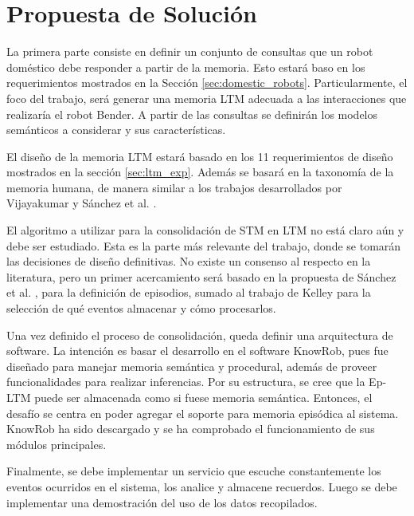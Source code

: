 \section{Propuesta de Solución}

%

La primera parte consiste en definir un conjunto de consultas que un robot doméstico debe responder a partir de la memoria. Esto estará baso en los requerimientos mostrados en la Sección \ref{sec:domestic_robots}. Particularmente, el foco del trabajo, será generar una memoria LTM adecuada a las interacciones que realizaría el robot Bender. A partir de las consultas se definirán los modelos semánticos a considerar y sus características. 

El diseño de la memoria LTM estará basado en los 11 requerimientos de diseño mostrados en la sección \ref{sec:ltm_exp}. Además se basará en la taxonomía de la memoria humana, de manera similar a los trabajos desarrollados por Vijayakumar  \cite{Vijayakumar2014} y Sánchez et al. \cite{Sanchez:2015}.

El algoritmo a utilizar para la consolidación de STM en LTM no está claro aún y debe ser estudiado. Esta es la parte más relevante del trabajo, donde se tomarán las decisiones de diseño definitivas. No existe un consenso al respecto en la literatura, pero un primer acercamiento será basado en la propuesta de Sánchez et al.  \cite{Sanchez:2015}, para la definición de episodios, sumado al trabajo de Kelley  \cite{Kelley2014} para la selección de qué eventos almacenar y cómo procesarlos.

Una vez definido el proceso de consolidación, queda definir una arquitectura de software. La intención es basar el desarrollo en el software KnowRob, pues fue diseñado para manejar memoria semántica y procedural, además de proveer funcionalidades para realizar inferencias. Por su estructura, se cree que la Ep-LTM puede ser almacenada como si fuese memoria semántica. Entonces, el desafío se centra en poder agregar el soporte para memoria episódica al sistema. KnowRob ha sido descargado y se ha comprobado el funcionamiento de sus módulos principales.

Finalmente, se debe implementar un servicio que escuche constantemente los eventos ocurridos en el sistema, los analice y almacene recuerdos. Luego se debe implementar una demostración del uso de los datos recopilados.

